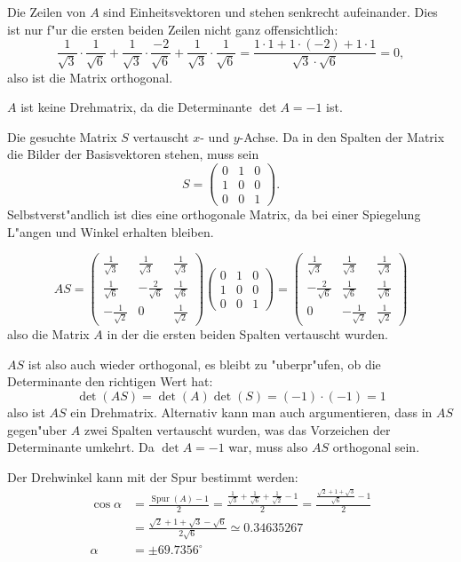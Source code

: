 \begin{loesung}
\begin{teilaufgaben}
\item Die Zeilen von $A$ sind Einheitsvektoren und stehen
senkrecht aufeinander. Dies ist nur f"ur die ersten beiden
Zeilen nicht ganz offensichtlich:
\[
\frac1{\sqrt{3}}\cdot\frac1{\sqrt{6}}
+
\frac1{\sqrt{3}}\cdot\frac{-2}{\sqrt{6}}
+
\frac1{\sqrt{3}}\cdot\frac1{\sqrt{6}}
=\frac{1\cdot 1+1\cdot(-2)+1\cdot 1}{\sqrt{3}\cdot\sqrt{6}}=0,
\]
also ist die Matrix orthogonal.
\item $A$ ist keine Drehmatrix, da die Determinante
$\det A=-1$ ist.
\item Die gesuchte Matrix $S$ vertauscht $x$- und $y$-Achse. Da in den
Spalten der Matrix die Bilder der Basisvektoren stehen, muss sein
\[
S=\begin{pmatrix}0&1&0\\1&0&0\\0&0&1\end{pmatrix}.
\]
Selbstverst"andlich ist dies eine orthogonale Matrix, da bei einer
Spiegelung L"angen und Winkel erhalten bleiben.
\item
\[
AS=
\begin{pmatrix}
\frac1{\sqrt{3}}&\frac1{\sqrt{3}}&\frac1{\sqrt{3}}\\
\frac1{\sqrt{6}}&-\frac2{\sqrt{6}}&\frac1{\sqrt{6}}\\
-\frac1{\sqrt{2}}&0&\frac1{\sqrt{2}}
\end{pmatrix}
\begin{pmatrix}0&1&0\\1&0&0\\0&0&1\end{pmatrix}
=\begin{pmatrix}
\frac1{\sqrt{3}}&\frac1{\sqrt{3}}&\frac1{\sqrt{3}}\\
-\frac2{\sqrt{6}}&\frac1{\sqrt{6}}&\frac1{\sqrt{6}}\\
0&-\frac1{\sqrt{2}}&\frac1{\sqrt{2}}
\end{pmatrix}
\]
also die Matrix $A$ in der die ersten beiden Spalten vertauscht
wurden.
\item
$AS$ ist also auch wieder orthogonal, es bleibt zu "uberpr"ufen,
ob die Determinante den richtigen Wert hat:
\[
\det(AS)=\det(A)\det(S)=(-1)\cdot(-1)=1
\]
also ist $AS$ ein Drehmatrix. Alternativ kann man auch argumentieren,
dass in $AS$ gegen"uber $A$ zwei Spalten vertauscht wurden, was das
Vorzeichen der Determinante umkehrt. Da $\det A=-1$ war, muss also
$AS$ orthogonal sein.
\item
Der Drehwinkel kann mit der Spur bestimmt
werden:
\begin{align*}
\cos \alpha&=\frac{\operatorname{Spur}(A)-1}2=\frac{\frac1{\sqrt{3}}+\frac1{\sqrt{6}}+\frac1{\sqrt{2}}-1}2
=\frac{\frac{\sqrt{2}+1+\sqrt{3}}{\sqrt{6}}-1}2
\\
&=\frac{\sqrt{2}+1+\sqrt{3}-\sqrt{6}}{2\sqrt{6}}\simeq  0.34635267
\\
\alpha&=\pm 69.7356^\circ
\end{align*}
\end{teilaufgaben}
\end{loesung}

